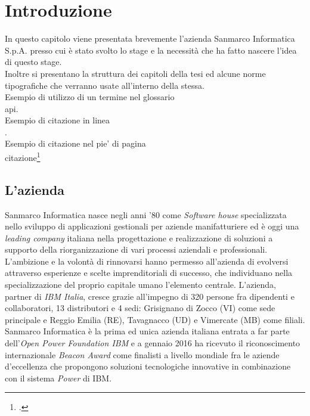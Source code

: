 
\chapter{Introduzione}
\label{cap:introduzione}

In questo capitolo viene presentata brevemente l'azienda Sanmarco Informatica S.p.A. presso cui è stato svolto lo stage e la necessità che ha fatto nascere l'idea di questo stage.\\
Inoltre si presentano la struttura dei capitoli della tesi ed alcune norme tipografiche che verranno usate all’interno della stessa. \\




\noindent Esempio di utilizzo di un termine nel glossario \\
\gls{api}. \\

\noindent Esempio di citazione in linea \\
\cite{site:agile-manifesto}. \\

\noindent Esempio di citazione nel pie' di pagina \\
citazione\footcite{womak:lean-thinking} \\

\section{L'azienda}

Sanmarco Informatica nasce negli anni '80 come \textit{Software house} specializzata nello sviluppo di applicazioni gestionali per aziende manifatturiere ed è oggi una \textit{leading company} italiana nella progettazione e realizzazione di soluzioni a supporto della riorganizzazione di vari processi aziendali e professionali. L'ambizione e la volontà di rinnovarsi hanno permesso all'azienda di evolversi attraverso esperienze  e scelte imprenditoriali di successo, che individuano nella specializzazione del proprio capitale umano l'elemento centrale. L'azienda, partner di \textit{IBM Italia}, cresce grazie all'impegno di 320 persone fra dipendenti e collaboratori, 13 distributori e 4 sedi: Grisignano di Zocco (VI) come sede principale e Reggio Emilia (RE), Tavagnacco (UD) e Vimercate (MB) come filiali.
Sanmarco Informatica è la prima ed unica azienda italiana entrata a far parte dell'\textit{Open Power Foundation IBM} e a gennaio 2016 ha ricevuto il riconoscimento internazionale \textit{Beacon Award} come finalisti a livello mondiale fra le aziende d'eccellenza che propongono soluzioni tecnologiche innovative in combinazione con il sistema \textit{Power} di IBM.




